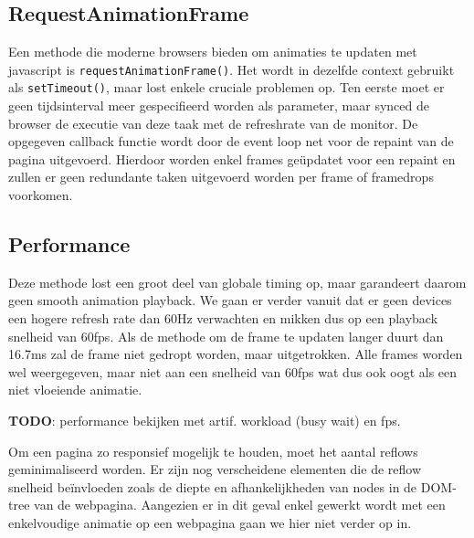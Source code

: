 \subsection{RequestAnimationFrame}

Een methode die moderne browsers bieden om animaties te updaten met javascript is \texttt{requestAnimationFrame()}. Het wordt in dezelfde context gebruikt als \texttt{setTimeout()}, maar lost enkele cruciale problemen op. Ten eerste moet er geen tijdsinterval meer gespecifieerd worden als parameter, maar synced de browser de executie van deze taak met de refreshrate van de monitor. De opgegeven callback functie wordt door de event loop net voor de repaint van de pagina uitgevoerd. Hierdoor worden enkel frames geüpdatet voor een repaint en zullen er geen redundante taken uitgevoerd worden per frame of framedrops voorkomen. \cite{requestFrameDocs}

\subsection{Performance} \label{performance}
Deze methode lost een groot deel van globale timing op, maar garandeert daarom geen smooth animation playback. We gaan er verder vanuit dat er geen devices een hogere refresh rate dan 60Hz verwachten en mikken dus op een playback snelheid van 60fps. Als de methode om de frame te updaten langer duurt dan 16.7ms zal de frame niet gedropt worden, maar uitgetrokken. Alle frames worden wel weergegeven, maar niet aan een snelheid van 60fps wat dus ook oogt als een niet vloeiende animatie.

\textbf{TODO}: performance bekijken met artif. workload (busy wait) en fps.

Om een pagina zo responsief mogelijk te houden, moet het aantal reflows geminimaliseerd worden. Er zijn nog verscheidene elementen die de reflow snelheid beïnvloeden zoals de diepte en afhankelijkheden van nodes in de DOM-tree van de webpagina. Aangezien er in dit geval enkel gewerkt wordt met een enkelvoudige animatie op een webpagina gaan we hier niet verder op in.
\cite{improvePerformance}
